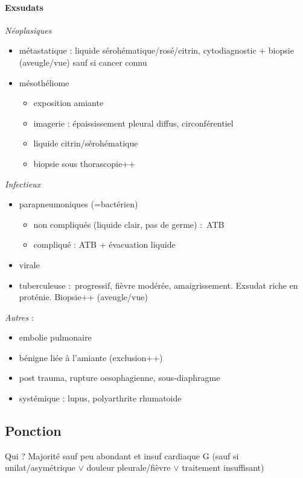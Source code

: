 \paragraph{Exsudats}
\textit{Néoplasiques} 
\begin{itemize}
  \item métastatique : liquide sérohématique/rosé/citrin, cytodiagnostic +
    biopsie (aveugle/vue) sauf si cancer connu
  \item mésothéliome 
    \begin{itemize}
      \item exposition amiante
      \item imagerie : épaississement pleural diffus, circonférentiel
      \item liquide citrin/sérohématique
      \item biopsie sous thorascopie++
    \end{itemize}
\end{itemize}

\textit{Infectieux} 
\begin{itemize}
  \item parapneumoniques (=bactérien) 
    \begin{itemize}
      \item non compliqués (liquide clair, pas de germe) : ATB
      \item compliqué : ATB + évacuation liquide
    \end{itemize}
  \item virale
  \item tuberculeuse : progressif, fièvre modérée, amaigrissement. Exsudat riche
    en proténie. Biopsie++ (aveugle/vue)
\end{itemize}

\textit{Autres}  :
\begin{itemize}
  \item embolie pulmonaire
  \item bénigne liée à l'amiante (exclusion++)
  \item post trauma, rupture oesophagienne, sous-diaphragme
  \item systémique : lupus, polyarthrite rhumatoide
\end{itemize}

\subsection{Ponction}
Qui ? Majorité sauf peu abondant et insuf cardiaque G (sauf si
unilat/asymétrique $\vee$ douleur pleurale/fièvre $\vee$ traitement insuffisant)

